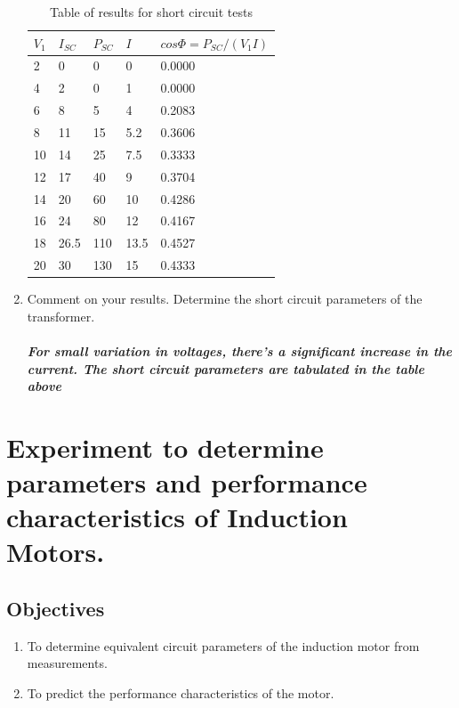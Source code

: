 \documentclass[12pt,a4paper]{report}
\begin{document}
\begin{enumerate}
\begin{table}[H]
\centering
    \caption{Table of results for short circuit tests}
    \begin{tabular}{|l|l|l|l|l|}
    \hline
    $V_{1}$ & $I_{SC}$  & $P_{SC}$ & $I$    & $cos\Phi=P_{SC}/(V_{1}I)$ \\ \hline
    2  & 0    & 0   & 0    & 0.0000         \\ \hline
    4  & 2    & 0   & 1    & 0.0000         \\ \hline
    6  & 8    & 5   & 4    & 0.2083         \\ \hline
    8  & 11   & 15  & 5.2  & 0.3606         \\ \hline
    10 & 14   & 25  & 7.5  & 0.3333         \\ \hline
    12 & 17   & 40  & 9    & 0.3704         \\ \hline
    14 & 20   & 60  & 10   & 0.4286         \\ \hline
    16 & 24   & 80  & 12   & 0.4167         \\ \hline
    18 & 26.5 & 110 & 13.5 & 0.4527         \\ \hline
    20 & 30   & 130 & 15   & 0.4333         \\ \hline
    \end{tabular}
    \end{table}
    \item Comment on your results. Determine the short circuit parameters of the transformer.\\
    \\
    \textbf{\textit{For small variation in voltages, there's a significant increase in the current. The short circuit parameters are tabulated in the table above}}
\end{enumerate}  
\chapter{Experiment to determine parameters and performance characteristics of Induction Motors.}
\section{Objectives}
\begin{enumerate}
    \item To determine equivalent circuit parameters of the induction motor from measurements.
    \item To predict the performance characteristics of the motor.
\end{enumerate}
\end{document}
